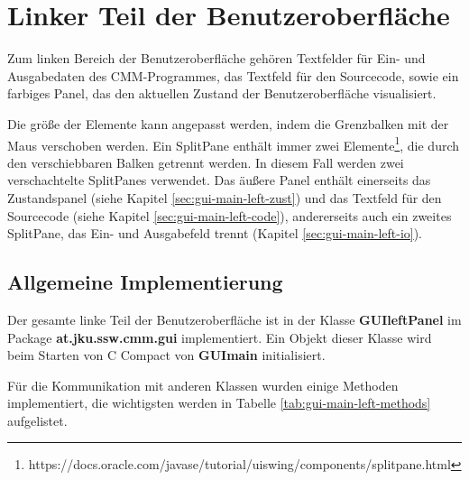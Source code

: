 \section{Linker Teil der Benutzeroberfläche}
\label{sec:gui-main-left-0}
Zum linken Bereich der Benutzeroberfläche gehören Textfelder für Ein- und Ausgabedaten des CMM-Programmes, das Textfeld für den Sourcecode, sowie ein farbiges Panel, das den aktuellen Zustand der Benutzeroberfläche visualisiert.

Die größe der Elemente kann angepasst werden, indem die Grenzbalken mit der Maus verschoben werden. Ein SplitPane enthält immer zwei Elemente\footnote{https://docs.oracle.com/javase/tutorial/uiswing/components/splitpane.html}, die durch den verschiebbaren Balken getrennt werden. In diesem Fall werden zwei verschachtelte SplitPanes verwendet. Das äußere Panel enthält einerseits das Zustandspanel (siehe Kapitel \ref{sec:gui-main-left-zust}) und das Textfeld für den Sourcecode (siehe Kapitel \ref{sec:gui-main-left-code}), andererseits auch ein zweites SplitPane, das Ein- und Ausgabefeld trennt (Kapitel \ref{sec:gui-main-left-io}).

\subsection{Allgemeine Implementierung}
Der gesamte linke Teil der Benutzeroberfläche ist in der Klasse \textbf{GUIleftPanel} im Package \textbf{at.jku.ssw.cmm.gui} implementiert. Ein Objekt dieser Klasse wird beim Starten von C Compact von \textbf{GUImain} initialisiert.

Für die Kommunikation mit anderen Klassen wurden einige Methoden implementiert, die wichtigsten werden in Tabelle \ref{tab:gui-main-left-methods} aufgelistet.

